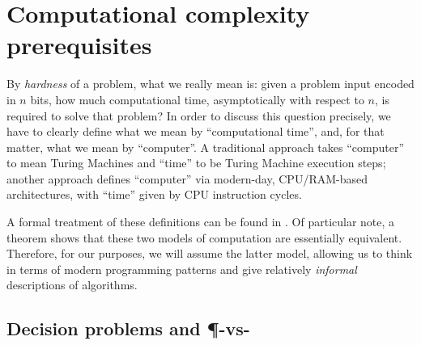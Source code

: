 %
%
%
%
%

\section{Computational complexity prerequisites}


By \emph{hardness} of a problem, what we really mean is: given a problem input
encoded in \(n\) bits, how much computational time, asymptotically with respect
to \(n\), is required to solve that problem?  In order to discuss this question
precisely, we have to clearly define what we mean by ``computational time'',
and, for that matter, what we mean by ``computer''.  A traditional approach
takes ``computer'' to mean Turing Machines and ``time'' to be Turing Machine
execution steps; another approach defines ``computer'' via modern-day,
CPU/RAM-based architectures, with ``time'' given by CPU instruction cycles.

A formal treatment of these definitions can be found in \textcite[Chapter
2]{papadimitriou.cc}.  Of particular note, a theorem \parencite[Theorem
2.5]{papadimitriou.cc} shows that these two models of computation are
essentially equivalent.  Therefore, for our purposes, we will assume the latter
model, allowing us to think in terms of modern programming patterns and give
relatively \emph{informal} descriptions of algorithms.

\subsection{Decision problems and \P-vs-\NP}

